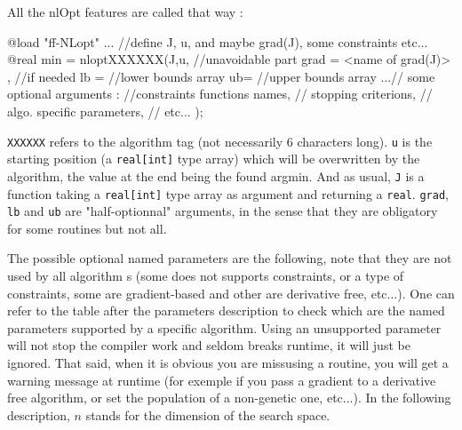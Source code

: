 \documentclass[a4paper,twoside,12pt]{book}
\begin{document}
All the nlOpt features are called that way :

\bFF
  @load "ff-NLopt"
  ... //define J, u, and maybe grad(J), some constraints etc...
  @real min = nloptXXXXXX(J,u,   //unavoidable part
                         grad = <name of grad(J)> , //if needed
                         lb = //lower bounds array
                         ub= //upper bounds array
                         ...//   some optional arguments :
                            //constraints functions names,
                            //                 stopping criterions,
                            //     algo. specific parameters,
                            //                                           etc...
                         );
\eFF

{\tt XXXXXX} refers to the algorithm tag (not necessarily 6 characters long). {\tt u} is the starting position (a {\tt real[int]} type array) which will be overwritten by the algorithm, the value at the end being the found argmin. And as usual, {\tt J} is a function taking a {\tt real[int]} type array as argument and returning a {\tt real}. {\tt grad}, {\tt lb} and {\tt ub} are "half-optionnal" arguments, in the sense that they are obligatory for some routines but not all.

The possible optional named parameters are the following, note that they are not used by all algorithm s (some does not supports constraints, or a type of constraints, some are gradient-based and other are derivative free, etc...). One can refer to the table after the parameters description to check which are the named parameters supported by a specific algorithm. Using an unsupported parameter will not stop 
the compiler work and seldom breaks runtime, it will just be ignored. That said, when it is obvious you are missusing a routine, you will get a warning message at runtime (for exemple if you pass a gradient 
to a derivative free algorithm, or set the population of a non-genetic one, etc...). In the following description, $n$ stands for the dimension of the search space.\\ \\
\end{document}
